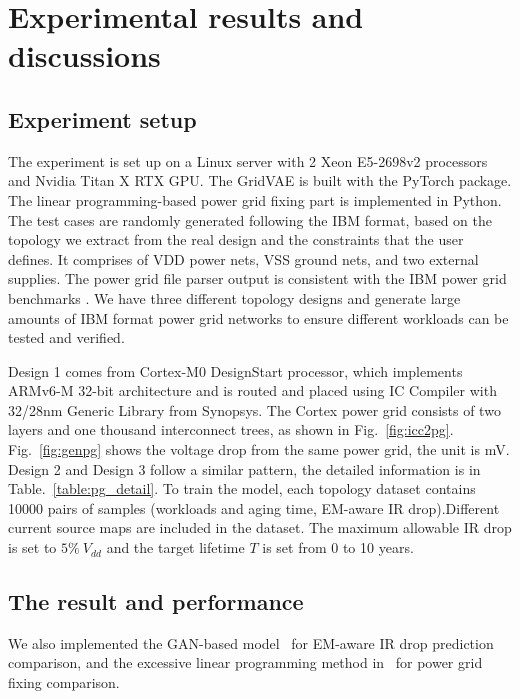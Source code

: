 \section{Experimental results and discussions}
\label{sec:results}
\subsection{Experiment setup}
The experiment is set up on a Linux server with 2 Xeon E5-2698v2 processors and Nvidia Titan X RTX GPU. 
The GridVAE is built with the PyTorch package. 
The linear programming-based power grid fixing part is implemented in Python.
The test cases are randomly generated following the IBM format, based on the topology we extract from the real design and the constraints that the user defines.
It comprises of VDD power nets, VSS ground nets, and two external supplies.
The power grid file parser output is consistent with the IBM power grid benchmarks \cite{Nassif:ASPDAC'08}.
We have three different topology designs and generate large amounts of IBM format power grid networks to ensure different workloads can be tested and verified. 

Design 1 comes from Cortex-M0 DesignStart processor, which implements ARMv6-M 32-bit architecture and is routed and placed using IC Compiler with 32/28nm Generic Library from Synopsys. 
The Cortex power grid consists of two layers and one thousand interconnect trees, as shown in Fig.~\ref{fig:icc2pg}. Fig.~\ref{fig:genpg} shows the voltage drop from the same power grid, the unit is mV.
Design 2 and Design 3 follow a similar pattern, the detailed information is in Table.~\ref{table:pg_detail}.
To train the model, each topology dataset contains 10000 pairs of samples  (workloads and aging time, EM-aware IR drop).Different current source maps are included in the dataset. The maximum allowable IR drop is set to $5\% \ V_{dd}$ and the target lifetime $\textit{T}$ is set from 0 to 10 years. 




\subsection{The result and performance}
We also implemented the GAN-based model~\cite{ZhouJin:ICCAD'20} for EM-aware IR drop prediction comparison, and the excessive linear programming method in~\cite{Sukharev:2019pg} for power grid fixing comparison. 

